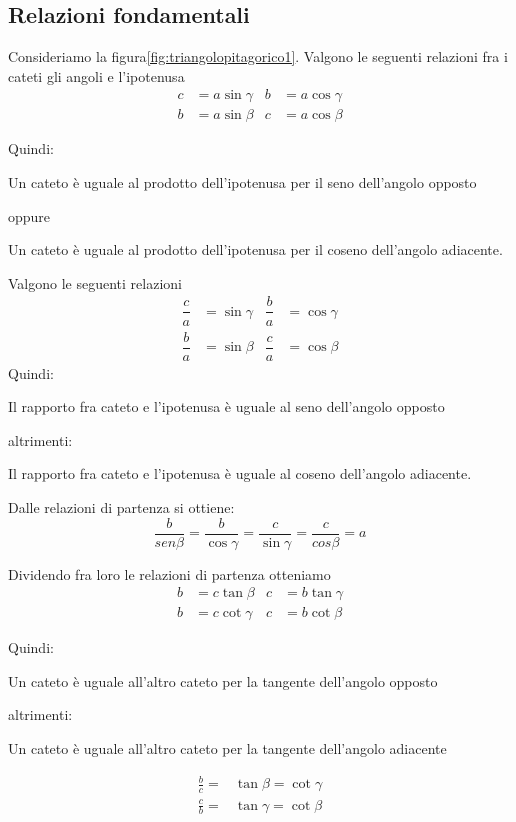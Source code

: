 \subsection{Relazioni fondamentali}
\begin{teoremat}{}{}
Consideriamo la figura\nobs\vref{fig:triangolopitagorico1}. Valgono le seguenti relazioni fra i cateti gli angoli e l'ipotenusa
\begin{align*}
c&=a\sin\gamma&b&=a\cos\gamma\\
b&=a\sin\beta&c&=a\cos\beta
\end{align*}
\end{teoremat}
\noindent Quindi:\par
Un cateto è uguale  al prodotto dell'ipotenusa per il seno dell'angolo opposto\par 
\noindent oppure\par 
Un cateto è uguale al prodotto dell'ipotenusa per il coseno dell'angolo adiacente.\par
\noindent Valgono le seguenti relazioni
\begin{align*}
\dfrac{c}{a}&=\sin\gamma&\dfrac{b}{a}&=\cos\gamma\\
\dfrac{b}{a}&=\sin\beta&\dfrac{c}{a}&=\cos\beta
\end{align*}
\noindent Quindi:\par
Il rapporto fra  cateto e l'ipotenusa è uguale al seno dell'angolo opposto\par
\noindent altrimenti:\par
Il rapporto fra  cateto e l'ipotenusa è uguale al coseno dell'angolo adiacente.\par 
\noindent Dalle relazioni di partenza si ottiene:
\[\dfrac{b}{sen\beta}=\dfrac{b}{\cos\gamma}=\dfrac{c}{\sin\gamma}=\dfrac{c}{cos\beta}=a \]
\begin{teoremat}{}{}
Dividendo fra loro le relazioni di partenza otteniamo
\begin{align*}
b&=c\tan\beta&c&=b\tan\gamma\\
b&=c\cot\gamma&c&=b\cot\beta
\end{align*}
\end{teoremat}
\noindent Quindi:\par
Un cateto è uguale all'altro cateto per la tangente dell'angolo opposto\par \noindent altrimenti:\par 
Un cateto è uguale all'altro cateto per la tangente dell'angolo adiacente\par
\begin{align*}
\frac{b}{c}=&\tan\beta=\cot\gamma\\
\frac{c}{b}=&\tan\gamma=\cot\beta
\end{align*}
